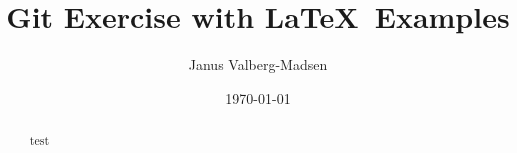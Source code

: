 \documentclass[10pt,a4paper]{article}
\title{Git Exercise with \LaTeX\ Examples}
\author{Janus Valberg-Madsen}
\date{\today}
\begin{document}
\maketitle

\begin{abstract}
  
  test
\end{abstract}

\tableofcontents



\end{document}
